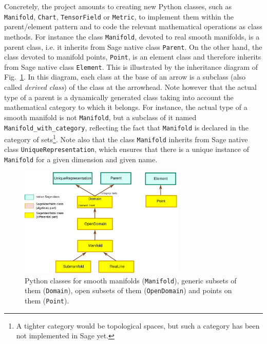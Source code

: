 \documentclass[a4paper]{jpconf}
\newcommand{\soft}[1]{\textsf{#1}}
\newcommand{\code}[1]{\texttt{#1}}
\newcommand{\Sage}{\soft{Sage}}
\begin{document}
Concretely, the project amounts to creating new Python classes,
 such as 
\code{Manifold}, \code{Chart}, \code{TensorField} or \code{Metric},
to implement them within the parent/element pattern and to 
code the relevant mathematical operations as class methods.
For instance the class \code{Manifold}, devoted to real smooth manifolds,
is a parent class, i.e. it inherits from Sage native class \code{Parent}.
On the other hand, the class devoted to manifold points, \code{Point}, 
is an element class and therefore inherits from Sage native class 
\code{Element}.
This is illustrated by the inheritance diagram of Fig.~\ref{f:domain_classes}.
In this diagram, each class at the base of an arrow is a subclass (also
called \emph{derived class}) of the class at the arrowhead.
Note however that the actual type of a parent is a dynamically generated
class taking into account the mathematical category to which it belongs. 
For instance, the actual type of a smooth manifold is not \code{Manifold}, but a
subclass of it named \code{Manifold\_with\_category}, 
reflecting the fact that \code{Manifold} is
declared in the category of sets\footnote{A tighter category would be
topological spaces, but such a category has been not implemented in \Sage{} yet.}.
Note also that the class \code{Manifold} inherits from \Sage{} native class
\texttt{UniqueRepresentation}, which ensures that there is a unique
instance of \code{Manifold} for a given dimension and given name. 

\begin{figure}
\begin{center}
\includegraphics[width=0.7\textwidth]{domain_classes.pdf}
\end{center}
\caption{\label{f:domain_classes} Python classes for 
smooth manifolds (\code{Manifold}), generic subsets of them 
(\code{Domain}), open subsets of them (\code{OpenDomain})
and points on them (\code{Point}).}
\end{figure}
\end{document}
